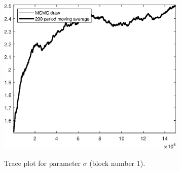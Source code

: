 \begin{figure}[H]
\centering
  \includegraphics[width=0.8\textwidth]{BRS_sectoral_wo_gmf/graphs/TracePlot_sigma_blck_1}\\
    \caption{Trace plot for parameter ${\sigma}$ (block number 1).}
\end{figure}
